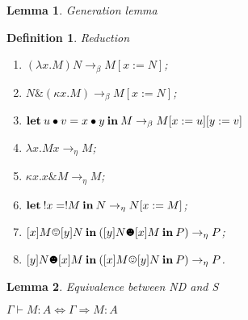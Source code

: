 \documentclass[a4paper]{article}
\newtheorem{lemma}{Lemma}
\newtheorem{defin}{Definition}
\begin{document}
\begin{lemma} Generation lemma
\end{lemma}

\begin{defin} Reduction

  \begin{enumerate}
    \item $(\lambda x. M) N \rightarrow_{\beta} M [x := N]$;
    \item $N \& (\kappa x. M) \rightarrow_{\beta} M [x := N]$;
    \item ${\bf let \:} u \bullet v = x \bullet y {\: \bf in \:} M \rightarrow_{\beta} M [x := u] [y := v]$
    \item $\lambda x. M x \rightarrow_{\eta} M$;
    \item $\kappa x. x \& M \rightarrow_{\eta} M$;
    \item ${\bf let \:} !x = !M {\: \bf in \:} N \rightarrow_{\eta} N [x := M]$;
    \item $[x]M \smiley [y]N {\: \bf in \:} ([y]N \blacksmiley [x]M {\: \bf in \:} P) \rightarrow_{\eta} P$;
    \item $[y]N \blacksmiley [x]M {\: \bf in \:} ([x]M \smiley [y]N {\: \bf in \:} P) \rightarrow_{\eta} P$.
  \end{enumerate}
\end{defin}

\begin{lemma} Equivalence between ND and S

  $\Gamma \vdash M : A \Leftrightarrow \Gamma \Rightarrow M : A$
\end{lemma}
\end{document}

